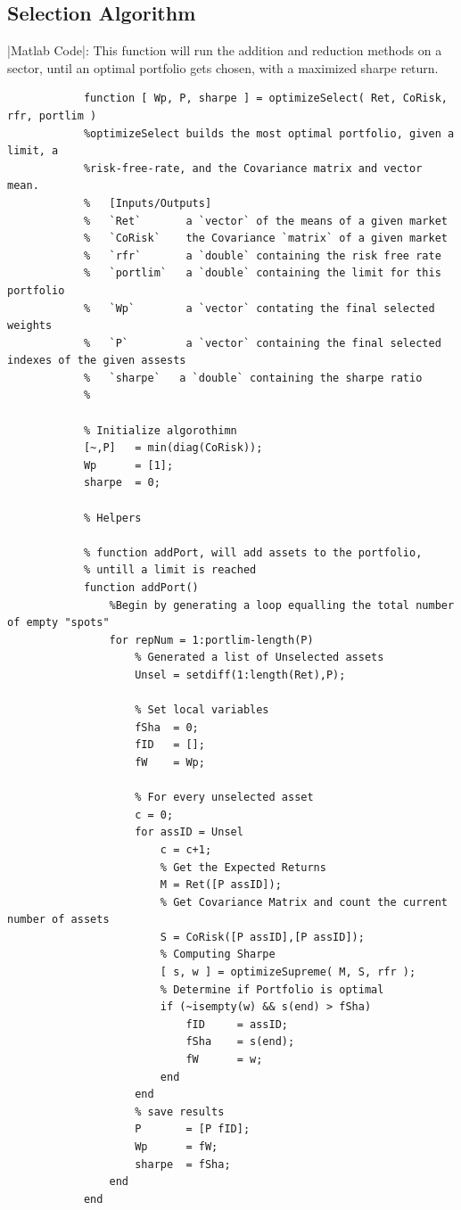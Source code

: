 \documentclass[12pt,titlepage,letter]{article}
\begin{document}
	\subsection{Selection Algorithm}
		|Matlab Code|: This function will run the addition and reduction methods on a sector, until an optimal portfolio gets chosen, with a maximized sharpe return.
		\begin{lstlisting}
			function [ Wp, P, sharpe ] = optimizeSelect( Ret, CoRisk, rfr, portlim )
			%optimizeSelect builds the most optimal portfolio, given a limit, a
			%risk-free-rate, and the Covariance matrix and vector mean.
			%   [Inputs/Outputs]
			%   `Ret`       a `vector` of the means of a given market
			%   `CoRisk`    the Covariance `matrix` of a given market
			%   `rfr`       a `double` containing the risk free rate
			%   `portlim`   a `double` containing the limit for this portfolio
			%   `Wp`        a `vector` contating the final selected weights
			%   `P`         a `vector` containing the final selected indexes of the given assests
			%   `sharpe`   a `double` containing the sharpe ratio
			%

			% Initialize algorothimn
			[~,P]   = min(diag(CoRisk));
			Wp      = [1];
			sharpe  = 0;

			% Helpers

			% function addPort, will add assets to the portfolio,
			% untill a limit is reached
			function addPort()
			    %Begin by generating a loop equalling the total number of empty "spots"
			    for repNum = 1:portlim-length(P)
			        % Generated a list of Unselected assets
			        Unsel = setdiff(1:length(Ret),P);

			        % Set local variables
			        fSha  = 0;
			        fID   = [];
			        fW    = Wp;

			        % For every unselected asset
			        c = 0;
			        for assID = Unsel
			            c = c+1;
			            % Get the Expected Returns
			            M = Ret([P assID]);
			            % Get Covariance Matrix and count the current number of assets
			            S = CoRisk([P assID],[P assID]);
			            % Computing Sharpe
			            [ s, w ] = optimizeSupreme( M, S, rfr );
			            % Determine if Portfolio is optimal
			            if (~isempty(w) && s(end) > fSha)
			                fID     = assID;
			                fSha    = s(end);
			                fW      = w;
			            end
			        end
			        % save results
			        P       = [P fID];
			        Wp      = fW;
			        sharpe  = fSha;
			    end
			end


\end{lstlisting}
\end{document}
